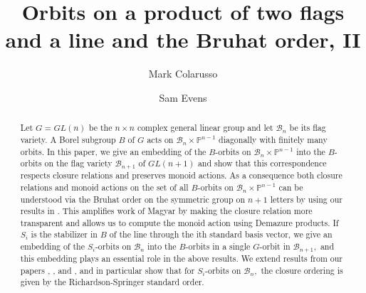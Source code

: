 \documentclass[12pt]{amsart}
\numberwithin{equation}{section}
\newcommand{\B}{\mathcal{B}}
\begin{document}
\title{Orbits on a product of two flags and a line and the Bruhat order, II}
\author[M. Colarusso]{Mark Colarusso}
\address{Department of Math and Stats, University of South Alabama, Mobile, AL, 36608}
\author[S. Evens]{Sam Evens}
\address{Department of Mathematics, University of Notre Dame, Notre Dame, IN, 46556}

\maketitle
\begin{abstract}
Let $G=GL(n)$ be the $n\times n$ complex general linear group and let $\B_{n}$ be its flag variety.  A Borel subgroup $B$ of $G$ acts on $\B_{n}\times \mathbb{P}^{n-1}$ diagonally with finitely many orbits.  In this paper, we give an embedding of the $B$-orbits on $\B_{n}\times \mathbb{P}^{n-1}$ into the $B$-orbits on the flag variety $\B_{n+1}$ of $GL(n+1)$ and show that this correspondence respects closure relations and preserves monoid actions.  As a consequence both closure relations and monoid actions on the set of all $B$-orbits on $\B_{n}\times\mathbb{P}^{n-1}$ can be understood via the Bruhat order on the symmetric group on $n+1$ letters by using our results in \cite{Shpairs}.  This amplifies work of Magyar \cite{Magyar} by making the closure relation more transparent and allows us to compute the monoid action using Demazure products.   If $S_i$ is the stabilizer in $B$ of the line through the ith standard basis vector, we give an embedding of the $S_i$-orbits on $\B_n$ into the $B$-orbits in a single $G$-orbit in $\B_{n+1},$ and this embedding plays an essential role in the above results.  We extend results from our papers \cite{CE21I}, \cite{CE21II}, and \cite{Shpairs}, and in particular show that for $S_i$-orbits on $\B_n,$ the closure ordering is given by the Richardson-Springer standard order.
\end{abstract}

\tableofcontents
\end{document}
